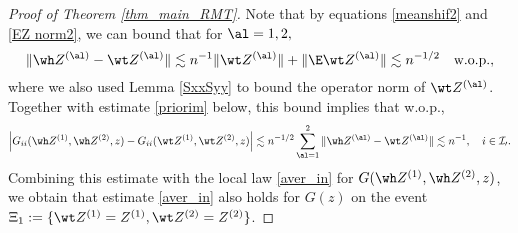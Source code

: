\documentclass[aos,preprint]{imsart}
\begin{document}
\begin{proof}[Proof of Theorem \ref{thm_main_RMT}]
Note that by equations \eqref{meanshif2} and \eqref{EZ norm2}, we can bound that for $\al=1,2,$
$$ \|\wh Z^{(\al)} - \wt Z^{(\al)}\|\lesssim n^{-1}\|\wt Z^{(\al)}\| + \|\E \wt Z^{(\al)}\|\lesssim n^{-1/2} \quad \text{w.o.p.},$$
where we also used Lemma \ref{SxxSyy} to bound the operator norm of $\wt Z^{(\al)}$. Together with estimate \eqref{priorim} below, this bound implies that w.o.p.,%
$$\left|  G_{ii}(\wh Z^{(1)},\wh Z^{(2)},z)-G_{ii}(\wt Z^{(1)},\wt Z^{(2)},z)  \right|  \lesssim  n^{-1/2} \sum_{\al=1}^2 \|\wh Z^{(\al)} - \wt Z^{(\al)}\| \lesssim n^{-1},\quad i\in \cal I_0.$$
Combining this estimate with the local law \eqref{aver_in} for $G(\wh Z^{(1)},\wh Z^{(2)},z)$, we obtain that estimate \eqref{aver_in} also holds for $G(z)$ on the event $\Xi_1:=\{\wt Z^{(1)} = Z^{(1)},  \wt Z^{(2)} = Z^{(2)}\}$. 





\end{proof}
\end{document}
